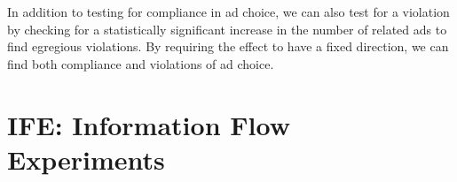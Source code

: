 \documentclass[10pt, onecolumn]{report}
\begin{document}
In addition to testing for compliance in ad choice, we can also test 
for a violation by checking for a statistically significant increase in 
the number of related ads to find egregious violations.
By requiring the effect to have a fixed direction, we can find 
both compliance and violations of ad choice.



\section{IFE: Information Flow Experiments}\label{sec:IFE}
\end{document}
